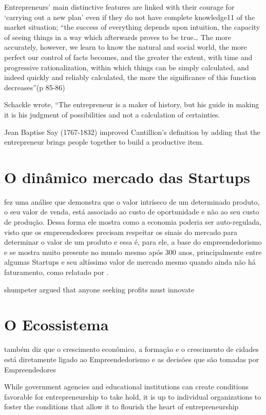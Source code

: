 Entrepreneurs’ main distinctive features are linked with their courage for ‘carrying
out a new plan’ even if they do not have complete knowledge11 of the market situation;
“the success of everything depends upon intuition, the capacity of seeing things in a way
which afterwards proves to be true… The more accurately, however, we learn to know
the natural and social world, the more perfect our control of facts becomes, and the
greater the extent, with time and progressive rationalization, within which things can be
simply calculated, and indeed quickly and reliably calculated, the more the significance of
this function decreases”(p 85-86)

Schackle wrote,
“The entrepreneur is a maker of history, but his guide in making it is his judgment of possibilities
and not a calculation of certainties.	

Jean Baptise Say (1767-1832) improved Cantillion’s definition by adding that the entrepreneur brings people together to build a productive item.

\section{O dinâmico mercado das Startups}

\cite{James1953} fez uma análise que demonstra que o valor intríseco de um determinado produto, o seu valor de venda, está associado ao custo de oportunidade e não ao seu custo de produção. Dessa forma ele mostra como a economia poderia ser auto-regulada, visto que os empreendedores precisam respeitar os sinais do mercado para determinar o valor de um produto e essa é, para ele, a base do empreendedorismo e se mostra muito presente no mundo mesmo após 300 anos, principalmente entre algumas Startups e seu altíssimo valor de mercado mesmo quando ainda não há faturamento, como relatado por \cite{Luckerson2013}.

shumpeter argued that anyone seeking profits must innovate


\section{O Ecossistema}
\label{section:ecossistemas_e_suas_pecas}

\cite{James1953} também diz que o crescimento econômico, a formação e o crescimento de cidades está diretamente ligado ao Empreendedorismo e as decisões que são tomadas por Empreendedores

While government agencies and educational institutions can create conditions favorable for entrepreneurship to take hold, it is up to individual organizations to foster the conditions that allow it to flourish the heart of entrepreneurship

